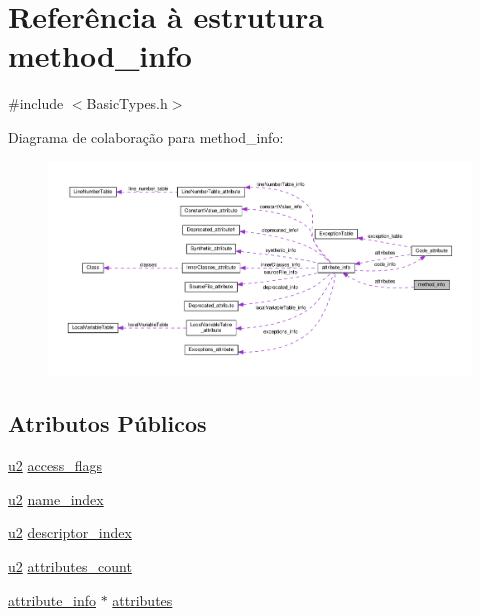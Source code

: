 \hypertarget{structmethod__info}{}\section{Referência à estrutura method\+\_\+info}
\label{structmethod__info}


{\ttfamily \#include $<$Basic\+Types.\+h$>$}



Diagrama de colaboração para method\+\_\+info\+:\nopagebreak
\begin{figure}[H]
\begin{center}
\leavevmode
\includegraphics[width=350pt]{structmethod__info__coll__graph}
\end{center}
\end{figure}
\subsection*{Atributos Públicos}
\begin{DoxyCompactItemize}
\item 
\hyperlink{BasicTypes_8h_a732cde1300aafb73b0ea6c2558a7a54f}{u2} \hyperlink{structmethod__info_a3b657027a141cdbc94ded28607c98be5}{access\+\_\+flags}
\item 
\hyperlink{BasicTypes_8h_a732cde1300aafb73b0ea6c2558a7a54f}{u2} \hyperlink{structmethod__info_ab91d62d0658b77bba83f6bb685e3bbb9}{name\+\_\+index}
\item 
\hyperlink{BasicTypes_8h_a732cde1300aafb73b0ea6c2558a7a54f}{u2} \hyperlink{structmethod__info_a7713103e0c8d060630ad62774fb9be37}{descriptor\+\_\+index}
\item 
\hyperlink{BasicTypes_8h_a732cde1300aafb73b0ea6c2558a7a54f}{u2} \hyperlink{structmethod__info_ad9e5e1e2fc850806addadd6deab8565d}{attributes\+\_\+count}
\item 
\hyperlink{structattribute__info}{attribute\+\_\+info} $\ast$ \hyperlink{structmethod__info_a8ce4caaa03680c91f548558a38647ad8}{attributes}
\end{DoxyCompactItemize}


